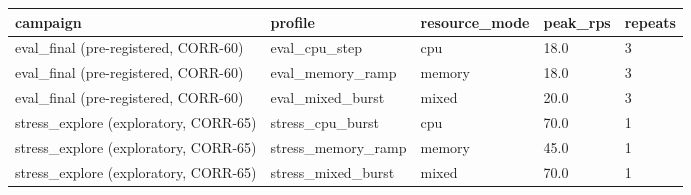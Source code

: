 \begin{tabular}{lllll}
\hline
campaign & profile & resource\_mode & peak\_rps & repeats \\
\hline
eval\_final (pre-registered, CORR-60) & eval\_cpu\_step & cpu & 18.0 & 3 \\
eval\_final (pre-registered, CORR-60) & eval\_memory\_ramp & memory & 18.0 & 3 \\
eval\_final (pre-registered, CORR-60) & eval\_mixed\_burst & mixed & 20.0 & 3 \\
stress\_explore (exploratory, CORR-65) & stress\_cpu\_burst & cpu & 70.0 & 1 \\
stress\_explore (exploratory, CORR-65) & stress\_memory\_ramp & memory & 45.0 & 1 \\
stress\_explore (exploratory, CORR-65) & stress\_mixed\_burst & mixed & 70.0 & 1 \\
\hline
\end{tabular}
